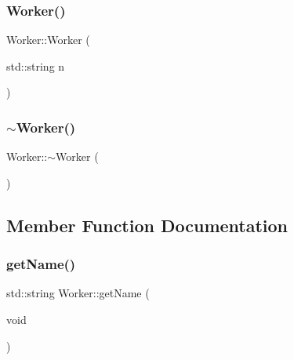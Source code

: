\subsubsection{\texorpdfstring{Worker()}{Worker()}\hspace{0.1cm}{\footnotesize\ttfamily [2/2]}}
{\footnotesize\ttfamily Worker\+::\+Worker (\begin{DoxyParamCaption}\item[{std\+::string}]{n }\end{DoxyParamCaption})\hspace{0.3cm}{\ttfamily [inline]}}

\hypertarget{class_worker_aa8e4543ef1e93fd9d884269ba30c5bfe}{}\label{class_worker_aa8e4543ef1e93fd9d884269ba30c5bfe} 
\subsubsection{\texorpdfstring{$\sim$\+Worker()}{~Worker()}}
{\footnotesize\ttfamily Worker\+::$\sim$\+Worker (\begin{DoxyParamCaption}{ }\end{DoxyParamCaption})\hspace{0.3cm}{\ttfamily [inline]}}



\subsection{Member Function Documentation}
\hypertarget{class_worker_ade174e6dfb792799a2455accc6153126}{}\label{class_worker_ade174e6dfb792799a2455accc6153126} 
\subsubsection{\texorpdfstring{get\+Name()}{getName()}}
{\footnotesize\ttfamily std\+::string Worker\+::get\+Name (\begin{DoxyParamCaption}\item[{void}]{ }\end{DoxyParamCaption})\hspace{0.3cm}{\ttfamily [inline]}}

\hypertarget{class_worker_aaba3653d2ee34cb8834e8d631989090f}{}\label{class_worker_aaba3653d2ee34cb8834e8d631989090f} 
